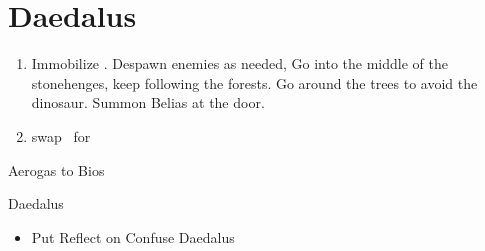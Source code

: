 \chapter{Daedalus}

\begin{enumerate}
\item Immobilize \penelo. Despawn enemies as needed, Go into the middle of the stonehenges, keep following the forests. Go around the trees to avoid the dinosaur. Summon Belias at the door.
\item swap \vaan\ for \balthier
\end{enumerate}
\begin{gambit}
Aerogas to Bios
\end{gambit}
\begin{battle}{Daedalus}
\begin{itemize}
\item Put Reflect on \balthier
\balthierf Confuse Daedalus
\end{itemize}
\end{battle}